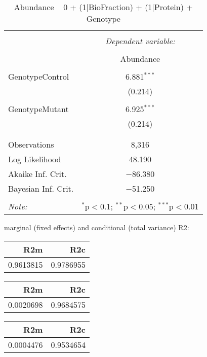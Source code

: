 \documentclass[11pt]{report}
\begin{document}
\begin{table}[!htbp] \centering 
  \caption{Abundance ~ 0 + (1|BioFraction) + (1|Protein) + Genotype} 
  \label{} 
\begin{tabular}{@{\extracolsep{5pt}}lc} 
\\[-1.8ex]\hline 
\hline \\[-1.8ex] 
 & \multicolumn{1}{c}{\textit{Dependent variable:}} \\ 
\cline{2-2} 
\\[-1.8ex] & Abundance \\ 
\hline \\[-1.8ex] 
 GenotypeControl & 6.881$^{***}$ \\ 
  & (0.214) \\ 
  & \\ 
 GenotypeMutant & 6.925$^{***}$ \\ 
  & (0.214) \\ 
  & \\ 
\hline \\[-1.8ex] 
Observations & 8,316 \\ 
Log Likelihood & 48.190 \\ 
Akaike Inf. Crit. & $-$86.380 \\ 
Bayesian Inf. Crit. & $-$51.250 \\ 
\hline 
\hline \\[-1.8ex] 
\textit{Note:}  & \multicolumn{1}{r}{$^{*}$p$<$0.1; $^{**}$p$<$0.05; $^{***}$p$<$0.01} \\ 
\end{tabular} 
\end{table} 
marginal (fixed effects) and conditional (total variance) R2:

\begin{tabular}{r|r}
\hline
R2m & R2c\\
\hline
0.9613815 & 0.9786955\\
\hline
\end{tabular}

\begin{tabular}{r|r}
\hline
R2m & R2c\\
\hline
0.0020698 & 0.9684575\\
\hline
\end{tabular}

\begin{tabular}{r|r}
\hline
R2m & R2c\\
\hline
0.0004476 & 0.9534654\\
\hline
\end{tabular}
\end{document}
